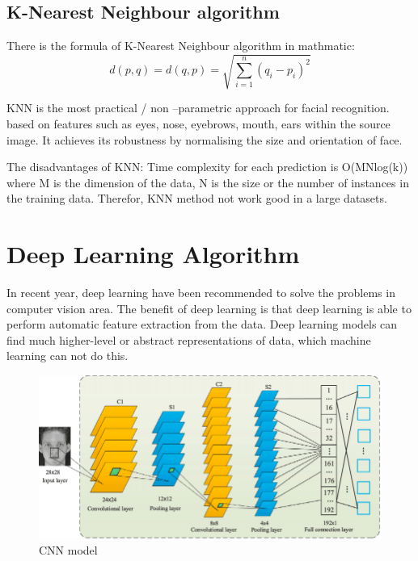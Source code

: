 \documentclass[10pt,twocolumn,letterpaper]{article}
\begin{document}
\subsection{K-Nearest Neighbour algorithm} There is the formula of K-Nearest Neighbour algorithm in mathmatic:
\begin{equation}
  d(p,q) = d(q,p) = \sqrt{\sum_{i=1}^{n} (q_i - p_i)^{2}}
 \end{equation}
 
KNN is the most practical / non –parametric approach for facial recognition. ~\cite{knn}
based on features such as eyes, nose, eyebrows, mouth, ears within the source image. 
It achieves its robustness by normalising the size and orientation of face. ~\cite{4}

The disadvantages of KNN: 
Time complexity for each prediction is O(MNlog(k)) where M is the dimension of the data, N is the size or the number of instances in the training data.
Therefor, KNN method not work good in a large datasets.




\section{Deep Learning Algorithm}
In recent year, deep learning have been recommended to solve the problems in computer vision area.
The benefit of deep learning is that deep learning is able to perform automatic feature extraction from the data.
Deep learning models can find much higher-level or abstract representations of data, which machine learning can not do this.

\begin{figure}[t]
  \centering
   \includegraphics[width=0.8\linewidth]{CNN.png}

   \caption{CNN model ~\cite{cnn}}
\end{figure}
\end{document}
